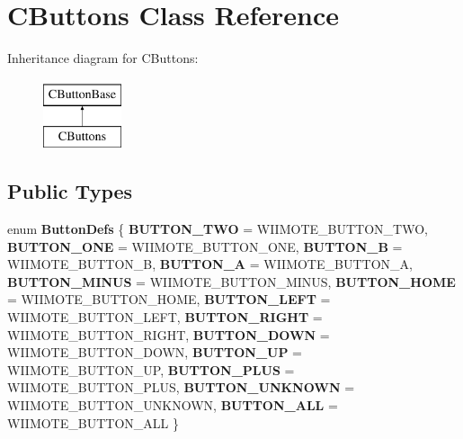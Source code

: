 \hypertarget{class_c_buttons}{\section{\-C\-Buttons \-Class \-Reference}
\label{class_c_buttons}
}
\-Inheritance diagram for \-C\-Buttons\-:\begin{figure}[H]
\begin{center}
\leavevmode
\includegraphics[height=2.000000cm]{class_c_buttons}
\end{center}
\end{figure}
\subsection*{\-Public \-Types}
\begin{DoxyCompactItemize}
\item 
enum {\bfseries \-Button\-Defs} \{ \*
{\bfseries \-B\-U\-T\-T\-O\-N\-\_\-\-T\-W\-O} =  \-W\-I\-I\-M\-O\-T\-E\-\_\-\-B\-U\-T\-T\-O\-N\-\_\-\-T\-W\-O, 
{\bfseries \-B\-U\-T\-T\-O\-N\-\_\-\-O\-N\-E} =  \-W\-I\-I\-M\-O\-T\-E\-\_\-\-B\-U\-T\-T\-O\-N\-\_\-\-O\-N\-E, 
{\bfseries \-B\-U\-T\-T\-O\-N\-\_\-\-B} =  \-W\-I\-I\-M\-O\-T\-E\-\_\-\-B\-U\-T\-T\-O\-N\-\_\-\-B, 
{\bfseries \-B\-U\-T\-T\-O\-N\-\_\-\-A} =  \-W\-I\-I\-M\-O\-T\-E\-\_\-\-B\-U\-T\-T\-O\-N\-\_\-\-A, 
\*
{\bfseries \-B\-U\-T\-T\-O\-N\-\_\-\-M\-I\-N\-U\-S} =  \-W\-I\-I\-M\-O\-T\-E\-\_\-\-B\-U\-T\-T\-O\-N\-\_\-\-M\-I\-N\-U\-S, 
{\bfseries \-B\-U\-T\-T\-O\-N\-\_\-\-H\-O\-M\-E} =  \-W\-I\-I\-M\-O\-T\-E\-\_\-\-B\-U\-T\-T\-O\-N\-\_\-\-H\-O\-M\-E, 
{\bfseries \-B\-U\-T\-T\-O\-N\-\_\-\-L\-E\-F\-T} =  \-W\-I\-I\-M\-O\-T\-E\-\_\-\-B\-U\-T\-T\-O\-N\-\_\-\-L\-E\-F\-T, 
{\bfseries \-B\-U\-T\-T\-O\-N\-\_\-\-R\-I\-G\-H\-T} =  \-W\-I\-I\-M\-O\-T\-E\-\_\-\-B\-U\-T\-T\-O\-N\-\_\-\-R\-I\-G\-H\-T, 
\*
{\bfseries \-B\-U\-T\-T\-O\-N\-\_\-\-D\-O\-W\-N} =  \-W\-I\-I\-M\-O\-T\-E\-\_\-\-B\-U\-T\-T\-O\-N\-\_\-\-D\-O\-W\-N, 
{\bfseries \-B\-U\-T\-T\-O\-N\-\_\-\-U\-P} =  \-W\-I\-I\-M\-O\-T\-E\-\_\-\-B\-U\-T\-T\-O\-N\-\_\-\-U\-P, 
{\bfseries \-B\-U\-T\-T\-O\-N\-\_\-\-P\-L\-U\-S} =  \-W\-I\-I\-M\-O\-T\-E\-\_\-\-B\-U\-T\-T\-O\-N\-\_\-\-P\-L\-U\-S, 
{\bfseries \-B\-U\-T\-T\-O\-N\-\_\-\-U\-N\-K\-N\-O\-W\-N} =  \-W\-I\-I\-M\-O\-T\-E\-\_\-\-B\-U\-T\-T\-O\-N\-\_\-\-U\-N\-K\-N\-O\-W\-N, 
\*
{\bfseries \-B\-U\-T\-T\-O\-N\-\_\-\-A\-L\-L} =  \-W\-I\-I\-M\-O\-T\-E\-\_\-\-B\-U\-T\-T\-O\-N\-\_\-\-A\-L\-L
 \}
\end{DoxyCompactItemize}
